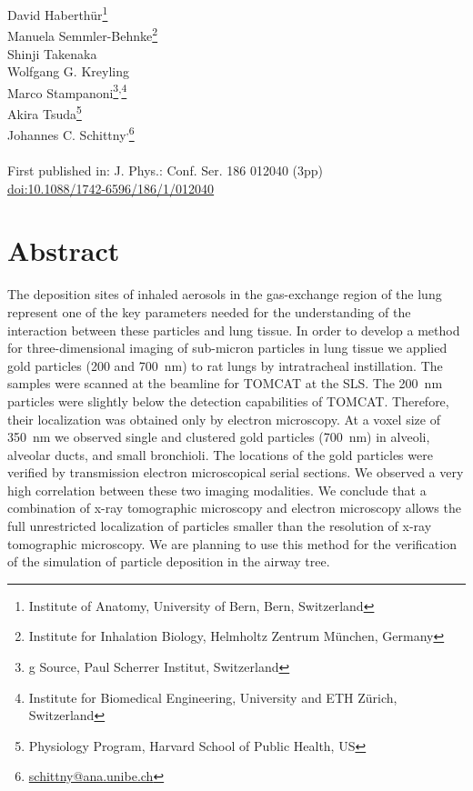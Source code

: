 \label{ch:XRM2008}

\newcommand{\footremember}[2]{\footnote{#2}\newcounter{#1}\setcounter{#1}{\value{footnote}}}%
\newcommand{\footrecall}[1]{\footnotemark[\value{#1}]} 

David Haberthür\footremember{ana}{Institute of Anatomy, University of Bern, Bern, Switzerland}\\
Manuela Semmler-Behnke\footremember{inhalation}{Institute for Inhalation Biology, Helmholtz Zentrum München, Germany}\\
Shinji Takenaka\footrecall{inhalation}\\
Wolfgang G. Kreyling\footrecall{inhalation}\\
Marco Stampanoni\footremember{psi}{g Source, Paul Scherrer Institut, Switzerland}\textsuperscript{,}\footremember{eth}{Institute for Biomedical Engineering, University and ETH Zürich, Switzerland}\\
Akira Tsuda\footnote{Physiology Program, Harvard School of Public Health, US}\\
Johannes C. Schittny\footrecall{ana}\textsuperscript{,}\footnote{\href{mailto:schittny@ana.unibe.ch}{schittny@ana.unibe.ch}}\\\\
First published in: J. Phys.: Conf. Ser. 186 012040 (3pp)\\
\href{http://dx.doi.org/10.1088/1742-6596/186/1/012040}{doi:10.1088/1742-6596/186/1/012040}

\section{Abstract}
The deposition sites of inhaled aerosols in the gas-exchange region of the lung represent one of the key parameters needed for the understanding of the interaction between these particles and lung tissue. In order to develop a method for three-dimensional imaging of sub-micron particles in lung tissue we applied gold particles (200 and \SI{700}{\nano\meter}) to rat lungs by intratracheal instillation. The samples were scanned at the beamline for \ac{TOMCAT} at the \acl{SLS}. The \SI{200}{\nano\meter} particles were slightly below the detection capabilities of \acs{TOMCAT}. Therefore, their localization was obtained only by electron microscopy. At a voxel size of \SI{350}{\nano\meter} we observed single and clustered gold particles (\SI{700}{\nano\meter}) in alveoli, alveolar ducts, and small bronchioli. The locations of the gold particles were verified by transmission electron microscopical serial sections. We observed a very high correlation between these two imaging modalities. We conclude that a combination of x-ray tomographic microscopy and electron microscopy allows the full unrestricted \threed localization of particles smaller than the resolution of x-ray tomographic microscopy. We are planning to use this method for the verification of the simulation of particle deposition in the airway tree.

